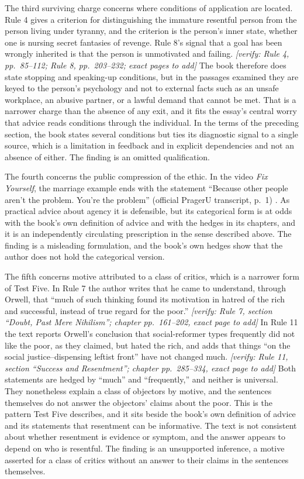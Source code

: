 \documentclass[12pt]{article}
\newif\ifverify\verifytrue
\newcommand{\passage}[1]{\ifverify{\footnotesize\color{gray}\textit{[verify: #1]}}\fi}
\begin{document}
The third surviving charge concerns where conditions of application are located. Rule 4 gives a criterion for distinguishing the immature resentful person from the person living under tyranny, and the criterion is the person's inner state, whether one is nursing secret fantasies of revenge. Rule 8's signal that a goal has been wrongly inherited is that the person is unmotivated and failing. \passage{Rule 4, pp.~85--112; Rule 8, pp.~203--232; exact pages to add} The book therefore does state stopping and speaking-up conditions, but in the passages examined they are keyed to the person's psychology and not to external facts such as an unsafe workplace, an abusive partner, or a lawful demand that cannot be met. That is a narrower charge than the absence of any exit, and it fits the essay's central worry that advice reads conditions through the individual. In the terms of the preceding section, the book states several conditions but ties its diagnostic signal to a single source, which is a limitation in feedback and in explicit dependencies and not an absence of either. The finding is an omitted qualification.

The fourth concerns the public compression of the ethic. In the video \emph{Fix Yourself}, the marriage example ends with the statement ``Because other people aren't the problem. You're the problem'' (official PragerU transcript, p.~1) \cite{pragerufix}. As practical advice about agency it is defensible, but its categorical form is at odds with the book's own definition of advice and with the hedges in its chapters, and it is an independently circulating prescription in the sense described above. The finding is a misleading formulation, and the book's own hedges show that the author does not hold the categorical version.

The fifth concerns motive attributed to a class of critics, which is a narrower form of Test Five. In Rule 7 the author writes that he came to understand, through Orwell, that ``much of such thinking found its motivation in hatred of the rich and successful, instead of true regard for the poor.'' \passage{Rule 7, section ``Doubt, Past Mere Nihilism''; chapter pp.~161--202, exact page to add} In Rule 11 the text reports Orwell's conclusion that social-reformer types frequently did not like the poor, as they claimed, but hated the rich, and adds that things ``on the social justice--dispensing leftist front'' have not changed much. \passage{Rule 11, section ``Success and Resentment''; chapter pp.~285--334, exact page to add} Both statements are hedged by ``much'' and ``frequently,'' and neither is universal. They nonetheless explain a class of objectors by motive, and the sentences themselves do not answer the objectors' claims about the poor. This is the pattern Test Five describes, and it sits beside the book's own definition of advice and its statements that resentment can be informative. The text is not consistent about whether resentment is evidence or symptom, and the answer appears to depend on who is resentful. The finding is an unsupported inference, a motive asserted for a class of critics without an answer to their claims in the sentences themselves.
\end{document}
